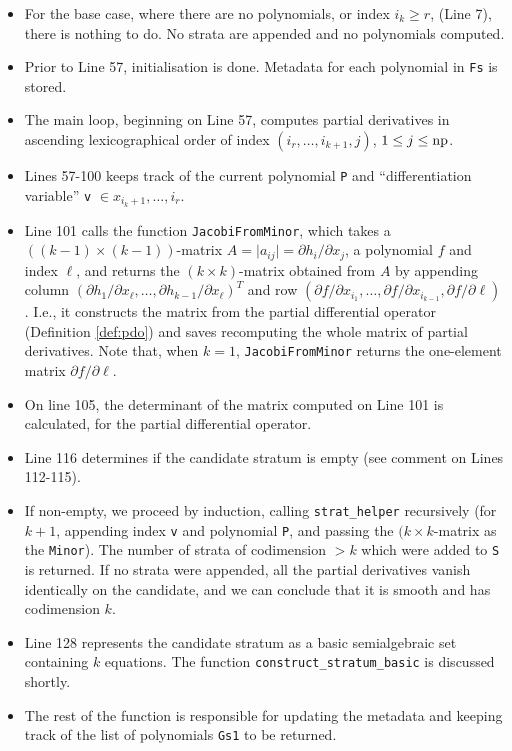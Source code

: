 \documentclass[
]{book}
\providecommand{\tightlist}{%
  \setlength{\itemsep}{0pt}\setlength{\parskip}{0pt}}
\theoremstyle{definition}
\theoremstyle{definition}
\theoremstyle{definition}
\theoremstyle{definition}
\theoremstyle{remark}
\begin{document}
\begin{itemize}
\tightlist
\item
  For the base case, where there are no polynomials, or index \(i_k \ge r\), (Line 7), there is nothing to do. No strata are appended and no polynomials computed.
\item
  Prior to Line 57, initialisation is done. Metadata for each polynomial in \texttt{Fs} is stored.
\item
  The main loop, beginning on Line 57, computes partial derivatives in ascending lexicographical order of index \((i_r,\ldots,i_{k+1},j)\), \(1 \le j \le \rm{np}\).
\item
  Lines 57-100 keeps track of the current polynomial \texttt{P} and ``differentiation variable'' \texttt{v} \(\in x_{i_k+1},\ldots,i_r\).
\item
  Line 101 calls the function \texttt{JacobiFromMinor}, which takes a \(((k-1)\times (k-1))\)-matrix \(A = \vert a_{ij} \vert = \partial h_i / \partial x_j\), a polynomial \(f\) and index \(\ell\), and returns the \((k \times k)\)-matrix obtained from \(A\) by appending column \((\partial h_1 / \partial x_\ell, \ldots, \partial h_{k-1} / \partial x_\ell)^T\) and row \((\partial f / \partial x_{i_1}, \ldots, \partial f / \partial x_{i_{k-1}}, \partial f / \partial \ell)\). I.e., it constructs the matrix from the partial differential operator (Definition \ref{def:pdo}) and saves recomputing the whole matrix of partial derivatives. Note that, when \(k=1\), \texttt{JacobiFromMinor} returns the one-element matrix \(\partial f / \partial \ell\).
\item
  On line 105, the determinant of the matrix computed on Line 101 is calculated, for the partial differential operator.
\item
  Line 116 determines if the candidate stratum is empty (see comment on Lines 112-115).
\item
  If non-empty, we proceed by induction, calling \texttt{strat\_helper} recursively (for \(k+1\), appending index \texttt{v} and polynomial \texttt{P}, and passing the \((k \times k\)-matrix as the \texttt{Minor}). The number of strata of codimension \(> k\) which were added to \texttt{S} is returned. If no strata were appended, all the partial derivatives vanish identically on the candidate, and we can conclude that it is smooth and has codimension \(k\).
\item
  Line 128 represents the candidate stratum as a basic semialgebraic set containing \(k\) equations. The function \texttt{construct\_stratum\_basic} is discussed shortly.
\item
  The rest of the function is responsible for updating the metadata and keeping track of the list of polynomials \texttt{Gs1} to be returned.
\end{itemize}
\end{document}
